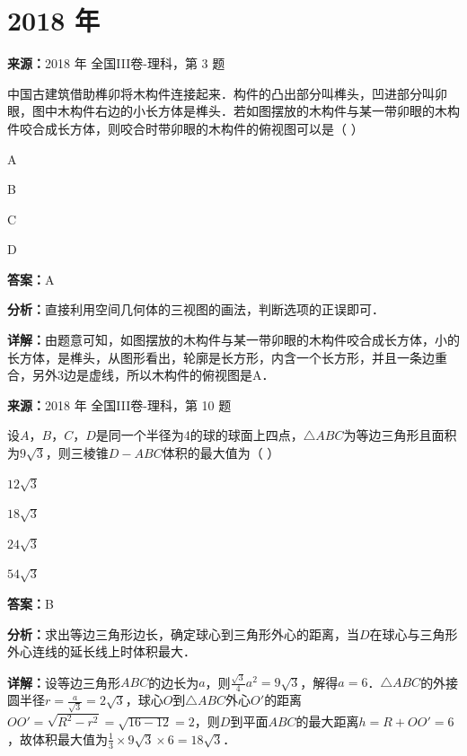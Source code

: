 \section*{2018 年}

\begin{question}[points=5]
\textbf{来源：}2018 年 全国III卷-理科，第 3 题\par
中国古建筑借助榫卯将木构件连接起来．构件的凸出部分叫榫头，凹进部分叫卯眼，图中木构件右边的小长方体是榫头．若如图摆放的木构件与某一带卯眼的木构件咬合成长方体，则咬合时带卯眼的木构件的俯视图可以是（ ）
\begin{choices}
  \item A
  \item B
  \item C
  \item D
\end{choices}
\begin{solution}
\textbf{答案：}A

\textbf{分析：}直接利用空间几何体的三视图的画法，判断选项的正误即可．

\textbf{详解：}由题意可知，如图摆放的木构件与某一带卯眼的木构件咬合成长方体，小的长方体，是榫头，从图形看出，轮廓是长方形，内含一个长方形，并且一条边重合，另外3边是虚线，所以木构件的俯视图是A．
\end{solution}
\end{question}

\begin{question}[points=5]
\textbf{来源：}2018 年 全国III卷-理科，第 10 题\par
设$A$，$B$，$C$，$D$是同一个半径为4的球的球面上四点，$\triangle ABC$为等边三角形且面积为$9\sqrt{3}$，则三棱锥$D-ABC$体积的最大值为（ ）
\begin{choices}
  \item $12\sqrt{3}$
  \item $18\sqrt{3}$
  \item $24\sqrt{3}$
  \item $54\sqrt{3}$
\end{choices}
\begin{solution}
\textbf{答案：}B

\textbf{分析：}求出等边三角形边长，确定球心到三角形外心的距离，当$D$在球心与三角形外心连线的延长线上时体积最大．

\textbf{详解：}设等边三角形$ABC$的边长为$a$，则$\frac{\sqrt{3}}{4}a^2=9\sqrt{3}$，解得$a=6$．$\triangle ABC$的外接圆半径$r=\frac{a}{\sqrt{3}}=2\sqrt{3}$，球心$O$到$\triangle ABC$外心$O'$的距离$OO'=\sqrt{R^2-r^2}=\sqrt{16-12}=2$，则$D$到平面$ABC$的最大距离$h=R+OO'=6$，故体积最大值为$\frac{1}{3}\times9\sqrt{3}\times6=18\sqrt{3}$．
\end{solution}
\end{question}

